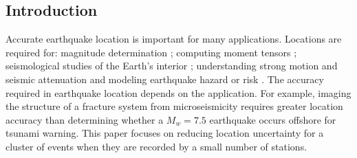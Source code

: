 \documentclass[12pt,double]{article}
\begin{document}



\vspace{2em}
\begin{centering}
\section*{Introduction} 
\end{centering}

Accurate earthquake location is important for many applications. Locations
are required for:  magnitude
determination \citep{dr_Richter35a, dr_Gutenberg45a};
computing moment tensors \citep{dr_Sipkin02a};
seismological studies of the Earth's interior
\citep{dr_Spencer80a, dr_Kennett95a, dr_Curtis02a, dr_Kennett04a};
understanding strong motion and seismic attenuation
\citep{dr_Toro97a, dr_Campbell03a}
 and modeling earthquake hazard or risk
\citep{dr_Frankel00a, dr_Stirling02a, dr_Robinson06b}.
The accuracy required in earthquake location depends on the
application. For example, imaging the structure of a fracture system
from microseismicity requires greater location accuracy than determining
whether a $M_w=7.5$ earthquake occurs offshore for tsunami warning.
 This paper focuses on reducing location uncertainty for
a cluster of events when they are recorded by a small
number of stations.
\end{document}
